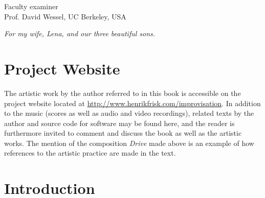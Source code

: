 \documentclass[a4paper]{book}
\numberwithin{equation}{section}
\begin{document}
\vspace{1cm}

\begin{minipage}[l]{\linewidth}
Faculty examiner
\\[.3cm]
Prof. David Wessel, UC Berkeley, USA
\end{minipage}

\vspace{3cm}



\cleardoublepage
\vspace*{4cm}
\begin{center}
\emph{For my wife, Lena, and our three beautiful sons.}
\end{center}



\chapter*{Project Website}
\label{sec:artistic}


The artistic work by the author referred to in this book is accessible on the project website located at \url{http://www.henrikfrisk.com/improvisation}. In addition to the music (scores as well as audio and video recordings), related texts by the author and source code for software may be found here, and the reader is furthermore invited to comment and discuss the book as well as the artistic works. The mention of the composition \emph{Drive} made above is an example of how references to the artistic practice are made in the text. 

\tableofcontents
\label{sec:toc}

\listoffigures
\label{sec:figures}


\chapter{Introduction}
\label{sec:introduction}
\pagestyle{fancy}
\setcounter{page}{1}

\end{document}
